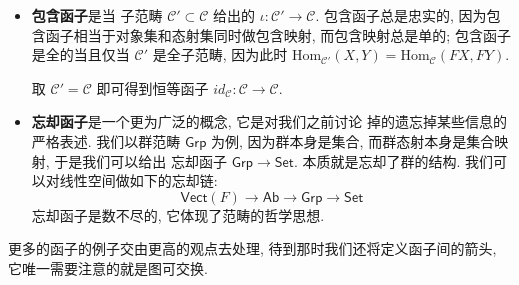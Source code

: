\documentclass[UTF8]{book}
\begin{document}
\begin{example}
    \begin{itemize}
        \item \textbf{包含函子}是当
        子范畴 $\mathcal{C}' \subset \mathcal{C}$ 给出的
        $ \iota : \mathcal{C}' \to \mathcal{C}$. 
        包含函子总是忠实的, 因为包含函子相当于对象集和态射集同时做包含映射, 
        而包含映射总是单的; 包含函子是全的当且仅当 $\mathcal{C}'$ 是全子范畴, 
        因为此时
        $ \mathrm{Hom}_{\mathcal{C}'}(X,Y) = \mathrm{Hom}_{\mathcal{C}}(FX,FY)$. 

        取 $\mathcal{C}' = \mathcal{C}$ 即可得到恒等函子 
        $id_{\mathcal{C}}: \mathcal{C} \to \mathcal{C}$. 

        \item \textbf{忘却函子}是一个更为广泛的概念, 它是对我们之前讨论
        掉的遗忘掉某些信息的严格表述. 我们以群范畴 $\mathsf{Grp}$ 为例, 
        因为群本身是集合, 而群态射本身是集合映射, 于是我们可以给出
        忘却函子 $\mathsf{Grp} \to \mathsf{Set}$. 
        本质就是忘却了群的结构. 
        我们可以对线性空间做如下的忘却链: 
        $$  \mathsf{Vect}(F) \to \mathsf{Ab} \to \mathsf{Grp} 
        \to \mathsf{Set}$$
        忘却函子是数不尽的, 它体现了范畴的哲学思想. 
    \end{itemize}
\end{example}

更多的函子的例子交由更高的观点去处理, 待到那时我们还将定义函子间的箭头, 
它唯一需要注意的就是图可交换. 
\end{document}
